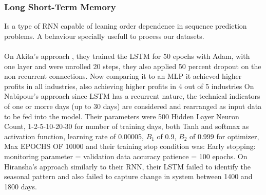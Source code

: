 \documentclass[conference]{IEEEtran}
\begin{document}
\subsubsection{Long Short-Term Memory}
Is a type of RNN capable of leaning order dependence in sequence prediction problems. A behaviour specially usefull to process our datasets. 
\\\\
On Akita's approach \cite{Akita2016}, they trained the LSTM for 50 epochs with Adam, with one layer and were unrolled 20 steps, they also applied 50 percent dropout on the non recurrent connections.
Now comparing it to an MLP it achieved higher profits in all industries, also achieving higher profits in 4 out of 5 industries 
On Nabipour's approach \cite{nabipour2020predicting} since LSTM has a recurrent nature, the technical indicators of one or morre days (up to 30 days) are considered and rearranged as input data to be fed into the model. Their parameters were 500 Hidden Layer Neuron Count, 1-2-5-10-20-30 for number of training days, both Tanh and softmax as activation function, learning rate of 0.00005, $B_1$ of 0.9, $B_2$ of 0.999 for optimizer, Max EPOCHS OF 10000 and their training stop condition
was: Early stopping: monitoring parameter = validation data accuracy patience = 100 epochs.
On Hiransha's approach \cite{M2018} similarly to their RNN, their LSTM failed to identify the seasonal pattern and also failed to capture change in system between 1400 and 1800 days.
\\\\
\end{document}
